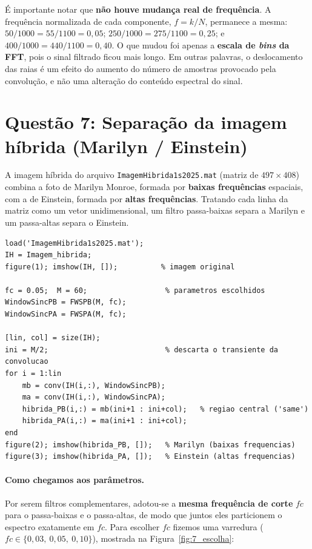 \documentclass[12pt,a4paper]{article}
\begin{document}
\'E importante notar que \textbf{n\~ao houve mudan\c{c}a real de frequ\^encia}. A
frequ\^encia normalizada de cada componente, $f = k/N$, permanece a mesma:
$50/1000 = 55/1100 = 0{,}05$; $250/1000 = 275/1100 = 0{,}25$; e
$400/1000 = 440/1100 = 0{,}40$. O que mudou foi apenas a \textbf{escala de
\textit{bins} da FFT}, pois o sinal filtrado ficou mais longo. Em outras palavras,
o deslocamento das raias \'e um efeito do aumento do n\'umero de amostras provocado
pela convolu\c{c}\~ao, e n\~ao uma altera\c{c}\~ao do conte\'udo espectral do sinal.

\section*{Quest\~ao 7: Separa\c{c}\~ao da imagem h\'ibrida (Marilyn / Einstein)}

A imagem h\'ibrida do arquivo \texttt{ImagemHibrida1s2025.mat} (matriz de
$497 \times 408$) combina a foto de Marilyn Monroe, formada por \textbf{baixas
frequ\^encias} espaciais, com a de Einstein, formada por \textbf{altas
frequ\^encias}. Tratando cada linha da matriz como um vetor unidimensional, um
filtro passa-baixas separa a Marilyn e um passa-altas separa o Einstein.

\begin{lstlisting}[caption={Filtragem da imagem h\'ibrida linha a linha.}]
load('ImagemHibrida1s2025.mat');
IH = Imagem_hibrida;
figure(1); imshow(IH, []);          % imagem original

fc = 0.05;  M = 60;                  % parametros escolhidos
WindowSincPB = FWSPB(M, fc);
WindowSincPA = FWSPA(M, fc);

[lin, col] = size(IH);
ini = M/2;                           % descarta o transiente da convolucao
for i = 1:lin
    mb = conv(IH(i,:), WindowSincPB);
    ma = conv(IH(i,:), WindowSincPA);
    hibrida_PB(i,:) = mb(ini+1 : ini+col);   % regiao central ('same')
    hibrida_PA(i,:) = ma(ini+1 : ini+col);
end
figure(2); imshow(hibrida_PB, []);   % Marilyn (baixas frequencias)
figure(3); imshow(hibrida_PA, []);   % Einstein (altas frequencias)
\end{lstlisting}

\paragraph{Como chegamos aos par\^ametros.} Por serem filtros complementares,
adotou-se a \textbf{mesma frequ\^encia de corte} $fc$ para o passa-baixas e o
passa-altas, de modo que juntos eles particionem o espectro exatamente em $fc$.
Para escolher $fc$ fizemos uma varredura ($fc \in \{0{,}03,\ 0{,}05,\ 0{,}10\}$),
mostrada na Figura~\ref{fig:7_escolha}:
\end{document}

